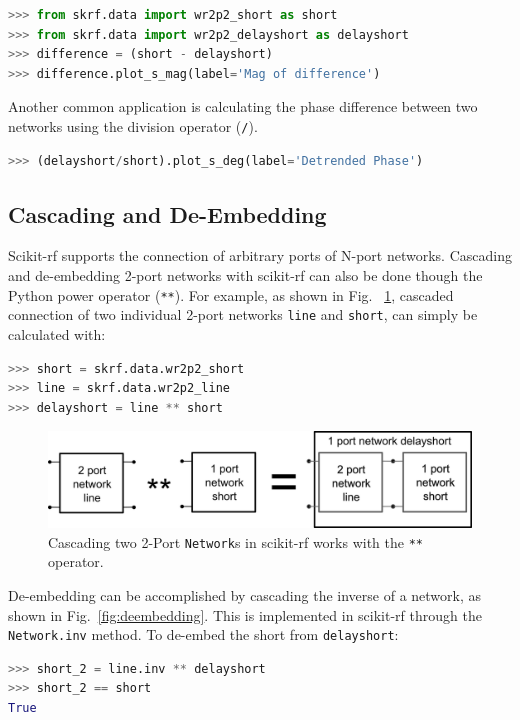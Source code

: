 \documentclass{IEEEjmw}
\begin{document}
\begin{lstlisting}[language=Python]
>>> from skrf.data import wr2p2_short as short
>>> from skrf.data import wr2p2_delayshort as delayshort
>>> difference = (short - delayshort)
>>> difference.plot_s_mag(label='Mag of difference')
\end{lstlisting}

Another common application is calculating the phase difference between two networks using the division operator (\texttt{/}). 

\begin{lstlisting}[language=Python]
>>> (delayshort/short).plot_s_deg(label='Detrended Phase')
\end{lstlisting}

\subsection{Cascading and De-Embedding}
Scikit-rf supports the connection of arbitrary ports of N-port networks. Cascading and de-embedding 2-port networks with scikit-rf can also be done though the Python power operator (\texttt{**}). For example, as shown in Fig. ~\ref{fig:cascading}, cascaded connection of two individual 2-port networks \texttt{line} and \texttt{short}, can simply be calculated with:

\begin{lstlisting}[language=Python]
>>> short = skrf.data.wr2p2_short
>>> line = skrf.data.wr2p2_line
>>> delayshort = line ** short
\end{lstlisting}

\begin{figure}
	\centering
	\includegraphics[width=0.95\linewidth]{figures/cascading}
	\caption{Cascading two 2-Port \texttt{Network}s in scikit-rf works with the \texttt{**} operator.}
	\label{fig:cascading}
\end{figure}

De-embedding can be accomplished by cascading the inverse of a network, as shown in Fig.~\ref{fig:deembedding}. This is implemented in scikit-rf through the \texttt{Network.inv} method. To de-embed the short from \texttt{delayshort}:

\begin{lstlisting}[language=Python]
>>> short_2 = line.inv ** delayshort
>>> short_2 == short
True
\end{lstlisting}
\end{document}
